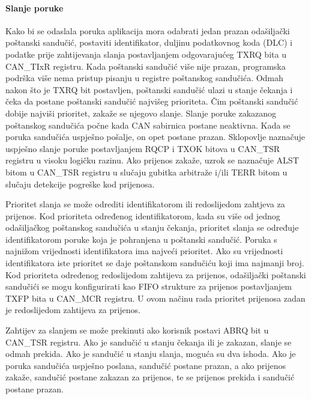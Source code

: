 \paragraph{Slanje poruke}

Kako bi se odaslala poruka aplikacija mora odabrati jedan prazan odašiljački poštanski sandučić, postaviti identifikator, duljinu podatkovnog koda (DLC) i podatke prije zahtijevanja slanja postavljanjem odgovarajućeg TXRQ bita u CAN\_TIxR registru. Kada poštanski sandučić više nije prazan, programska podrška više nema pristup pisanju u registre poštanskog sandučića. Odmah nakon što je TXRQ bit postavljen, poštanski sandučić ulazi u stanje čekanja i čeka da postane poštanski sandučić najvišeg prioriteta. Čim poštanski sandučić dobije najviši prioritet, zakaže se njegovo slanje. Slanje poruke zakazanog poštanskog sandučića počne kada CAN sabirnica postane neaktivna. Kada se poruka sandučića uspješno pošalje, on opet postane prazan. Sklopovlje naznačuje uspješno slanje poruke postavljanjem RQCP i TXOK bitova u CAN\_TSR registru u visoku logičku razinu. Ako prijenos zakaže, uzrok se naznačuje ALST bitom u CAN\_TSR registru u slučaju gubitka arbitraže i/ili TERR bitom u slučaju detekcije pogreške kod prijenosa.

Prioritet slanja se može odrediti identifikatorom ili redoslijedom zahtjeva za prijenos. Kod prioriteta određenog identifikatorom, kada su više od jednog odašiljačkog poštanskog sandučića u stanju čekanja, prioritet slanja se određuje identifikatorom poruke koja je pohranjena u poštanski sandučić. Poruka s najnižom vrijednosti identifikatora ima najveći prioritet. Ako su vrijednosti identifikatora iste prioritet se daje poštanskom sandučiću koji ima najmanji broj. Kod prioriteta određenog redoslijedom zahtijeva za prijenos, odašiljački poštanski sandučići se mogu konfigurirati kao FIFO strukture za prijenos postavljanjem TXFP bita u CAN\_MCR registru. U ovom načinu rada prioritet prijenosa zadan je redoslijedom zahtijeva za prijenos.

Zahtijev za slanjem se može prekinuti ako korisnik postavi ABRQ bit u CAN\_TSR registru. Ako je sandučić u stanju čekanja ili je zakazan, slanje se odmah prekida. Ako je sandučić u stanju slanja, moguća su dva ishoda. Ako je poruka sandučića uspješno poslana, sandučić postane prazan, a ako prijenos zakaže, sandučić postane zakazan za prijenos, te se prijenos prekida i sandučić postane prazan.



